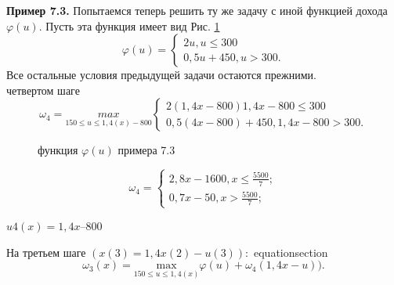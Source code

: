\indent\textbf{Пример 7.3.} Попытаемся теперь решить ту же задачу с иной функцией дохода $\varphi(u)$. Пусть эта функция имеет вид Рис. \ref{picture_7_5}\\
\[
\varphi(u) =
    \begin{cases}
        2u,u\leq300 \\
        0,5u+450,u>300.
    \end{cases}
\]
Все остальные условия предыдущей задачи остаются прежними. \\
 четвертом шаге
\[
\omega_4 =\underset{150\leq u\leq1,4(x)-800}{max}
    \begin{cases}
        2(1,4x-800)1,4x-800\leq300 \\
        0,5(4x-800)+450,1,4x-800>300.
    \end{cases}
\]
\begin{figure}[h]
\caption{функция $\varphi(u)$ примера 7.3 }
\label{picture_7_5}
\end{figure}
\[
\omega_4 =
    \begin{cases}
        2,8x-1600,x\leq\frac{5500}7 ;\\
        0,7x-50,x>\frac{5500}7 ;
    \end{cases}
\]
\begin{center}$u4(x) = 1,4x – 800$\end{center}
На третьем шаге $(x(3) = 1,4x(2)-u(3)):$\numberwithin
{equation}{section}\begin{equation*}\omega_3(x)=\underset{150\leq u\leq1,4(x)}{\mathrm{max}}\varphi(u)+\omega_4(1,4x-u)).\end{equation*}

